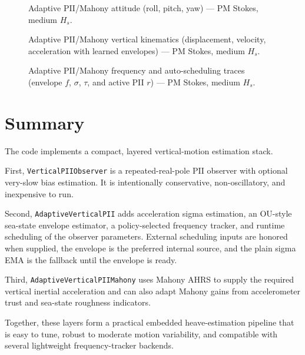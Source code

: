 \documentclass[conference]{IEEEtran}
\newcommand{\IncludePGF}[1]{\resizebox{\linewidth}{!}{}}
\begin{document}
    \begin{figure}[!t]\centering
    \IncludePGF{w3d_nonkalman_pmstokes_medium.pgf}
    \caption{Adaptive PII/Mahony attitude (roll, pitch, yaw) --- PM Stokes, medium $H_s$.}
    \label{fig:w3d_nonkalman_pmstokes_medium_angles}
    \end{figure}
    \begin{figure}[!t]\centering
    \IncludePGF{w3d_nonkalman_pmstokes_medium_zkin.pgf}
    \caption{Adaptive PII/Mahony vertical kinematics (displacement, velocity, acceleration with learned envelopes) --- PM Stokes, medium $H_s$.}
    \label{fig:w3d_nonkalman_pmstokes_medium_zkin}
    \end{figure}
    \begin{figure}[!t]\centering
    \IncludePGF{w3d_nonkalman_pmstokes_medium_tuner.pgf}
    \caption{Adaptive PII/Mahony frequency and auto-scheduling traces (envelope $f$, $\sigma$, $\tau$, and active PII $r$) --- PM Stokes, medium $H_s$.}
    \label{fig:w3d_nonkalman_pmstokes_medium_tuner}
    \end{figure}

    \section{Summary}

    The code implements a compact, layered vertical-motion estimation stack.

    First, \texttt{VerticalPIIObserver} is a repeated-real-pole PII observer with
    optional very-slow bias estimation. It is intentionally conservative,
    non-oscillatory, and inexpensive to run.

    Second, \texttt{AdaptiveVerticalPII} adds acceleration sigma estimation, an
    OU-style sea-state envelope estimator, a policy-selected frequency tracker,
    and runtime scheduling of the observer parameters. External scheduling
    inputs are honored when supplied, the envelope is the preferred internal
    source, and the plain sigma EMA is the fallback until the envelope is ready.

    Third, \texttt{AdaptiveVerticalPIIMahony} uses Mahony AHRS to supply the
    required vertical inertial acceleration and can also adapt Mahony gains from
    accelerometer trust and sea-state roughness indicators.

    Together, these layers form a practical embedded heave-estimation pipeline
    that is easy to tune, robust to moderate motion variability, and compatible
    with several lightweight frequency-tracker backends.
\end{document}
